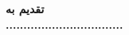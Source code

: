 \clearpage
\thispagestyle{empty}

{\BNazaninScaleOne
{\fontsize{20pt}{0}\selectfont \bfseries
\noindent
تقدیم به
\\[1cm]
\hspace*{1cm}
.................................
}}
		
\restoregeometry